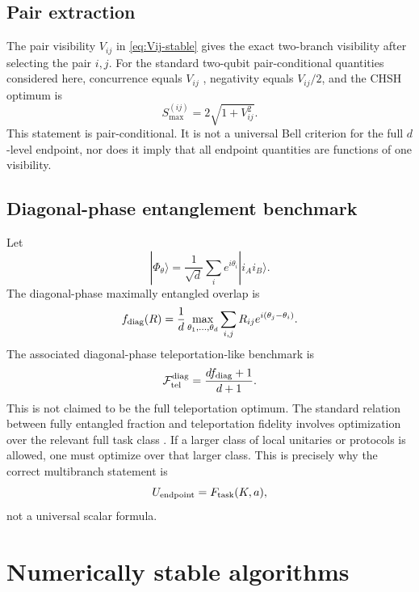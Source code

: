 \documentclass[reprint,aps,pra,superscriptaddress,nofootinbib,longbibliography]{revtex4-2}
\newcommand{\ket}[1]{|#1\rangle}
\newcommand{\Ftel}{\mathcal F_{\rm tel}}
\begin{document}
\subsection{Pair extraction}

The pair visibility \(V_{ij}\) in \eqref{eq:Vij-stable} gives the exact two-branch visibility after selecting the pair \(i,j\).  For the standard two-qubit pair-conditional quantities considered here, concurrence equals \(V_{ij}\) \cite{Wootters1998}, negativity equals \(V_{ij}/2\), and the CHSH optimum is \cite{Horodecki1995}
\begin{equation}
S_{\max}^{(ij)}=2\sqrt{1+V_{ij}^2}.
\label{eq:pair-chsh}
\end{equation}
This statement is pair-conditional.  It is not a universal Bell criterion for the full \(d\)-level endpoint, nor does it imply that all endpoint quantities are functions of one visibility.

\subsection{Diagonal-phase entanglement benchmark}

Let
\begin{equation}
\ket{\Phi_\theta}
=
\frac1{\sqrt d}\sum_i e^{i\theta_i}\ket{i_Ai_B}.
\end{equation}
The diagonal-phase maximally entangled overlap is
\begin{equation}
f_{\rm diag}(R)
=
\frac1d
\max_{\theta_1,\ldots,\theta_d}
\sum_{i,j}
R_{ij}e^{i(\theta_j-\theta_i)}.
\label{eq:fdiag}
\end{equation}
The associated diagonal-phase teleportation-like benchmark is
\begin{equation}
\Ftel^{\rm diag}
=
\frac{d f_{\rm diag}+1}{d+1}.
\label{eq:Fdiag}
\end{equation}
This is not claimed to be the full teleportation optimum.  The standard relation between fully entangled fraction and teleportation fidelity involves optimization over the relevant full task class \cite{Horodecki1999}.  If a larger class of local unitaries or protocols is allowed, one must optimize over that larger class.  This is precisely why the correct multibranch statement is
\[
U_{\rm endpoint}=F_{\rm task}(K,a),
\]
not a universal scalar formula.

\section{Numerically stable algorithms}
\label{sec:algorithms}
\end{document}
